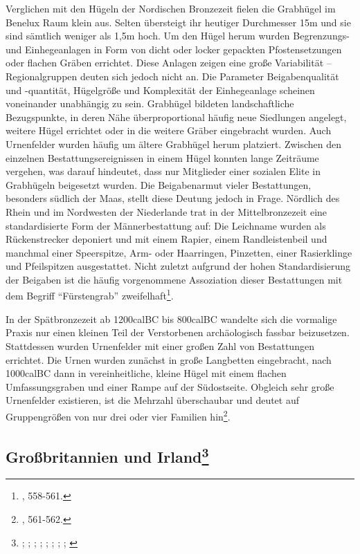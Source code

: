 \documentclass[openany,twoside,twocolumn]{book}
\let\rmarkdownfootnote\footnote%
\def\footnote{\protect\rmarkdownfootnote}
\begin{document}
Verglichen mit den Hügeln der Nordischen Bronzezeit fielen die Grabhügel im Benelux Raum klein aus. Selten übersteigt ihr heutiger Durchmesser 15m und sie sind sämtlich weniger als 1,5m hoch. Um den Hügel herum wurden Begrenzungs- und Einhegeanlagen in Form von dicht oder locker gepackten Pfostensetzungen oder flachen Gräben errichtet. Diese Anlagen zeigen eine große Variabilität -- Regionalgruppen deuten sich jedoch nicht an. Die Parameter Beigabenqualität und -quantität, Hügelgröße und Komplexität der Einhegeanlage scheinen voneinander unabhängig zu sein. Grabhügel bildeten landschaftliche Bezugspunkte, in deren Nähe überproportional häufig neue Siedlungen angelegt, weitere Hügel errichtet oder in die weitere Gräber eingebracht wurden. Auch Urnenfelder wurden häufig um ältere Grabhügel herum platziert. Zwischen den einzelnen Bestattungsereignissen in einem Hügel konnten lange Zeiträume vergehen, was darauf hindeutet, dass nur Mitglieder einer sozialen Elite in Grabhügeln beigesetzt wurden. Die Beigabenarmut vieler Bestattungen, besonders südlich der Maas, stellt diese Deutung jedoch in Frage. Nördlich des Rhein und im Nordwesten der Niederlande trat in der Mittelbronzezeit eine standardisierte Form der Männerbestattung auf: Die Leichname wurden als Rückenstrecker deponiert und mit einem Rapier, einem Randleistenbeil und manchmal einer Speerspitze, Arm- oder Haarringen, Pinzetten, einer Rasierklinge und Pfeilspitzen ausgestattet. Nicht zuletzt aufgrund der hohen Standardisierung der Beigaben ist die häufig vorgenommene Assoziation dieser Bestattungen mit dem Begriff ``Fürstengrab'' zweifelhaft\footnote{\textcite{fokkens_bronze_2013}, 558-561.}.

In der Spätbronzezeit ab 1200calBC bis 800calBC wandelte sich die vormalige Praxis nur einen kleinen Teil der Verstorbenen archäologisch fassbar beizusetzen. Stattdessen wurden Urnenfelder mit einer großen Zahl von Bestattungen errichtet. Die Urnen wurden zunächst in große Langbetten eingebracht, nach 1000calBC dann in vereinheitliche, kleine Hügel mit einem flachen Umfassungsgraben und einer Rampe auf der Südostseite. Obgleich sehr große Urnenfelder existieren, ist die Mehrzahl überschaubar und deutet auf Gruppengrößen von nur drei oder vier Familien hin\footnote{\textcite{fokkens_bronze_2013}, 561-562.}.

\hypertarget{great-britain-irland}{%
\subsection[Großbritannien und Irland]{\texorpdfstring{Großbritannien und Irland\footnote{\textcite{bradley_prehistory_2007}; \textcite{bruck_bronze_2001}; \textcite{bruck_death_2006}; \textcite{burgess_age_1980}; \textcite{eogan_construction_2004}; \textcite{medina-pettersson_bronze_2014}; \textcite{roberts_britain_2013}; \textcite{rogers_afterlife_2013}; \textcite{waddell_bronze_1990}}}{Großbritannien und Irland}}\label{great-britain-irland}}
\end{document}

